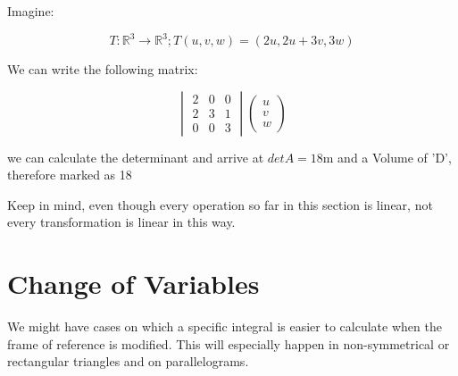 \documentclass[11pt,fleqn]{book} %
\begin{document}
\begin{example}
    Imagine: 

\begin{equation}
    T: \mathbb{R}^3 \to \mathbb{R}^3; T(u,v,w) = (2u, 2u+3v, 3w)
\end{equation}

We can write the following matrix:

\begin{equation}
    \begin{vmatrix}
        2 & 0 & 0 \\
        2 & 3 & 1 \\
        0 & 0 & 3
    \end{vmatrix} \begin{pmatrix}
        u \\
        v \\ 
        w 
    \end{pmatrix}
\end{equation}

we can calculate the determinant and arrive at $detA = 18$m and a Volume of 'D', therefore marked as 18 

Keep in mind, even though every operation so far in this section is linear, not every transformation is linear in this way. 

\end{example}

\section{Change of Variables}

We might have cases on which a specific integral is easier to calculate 
when the frame of reference is modified. This will especially happen in non-symmetrical or rectangular triangles
and on parallelograms.  
\end{document}
